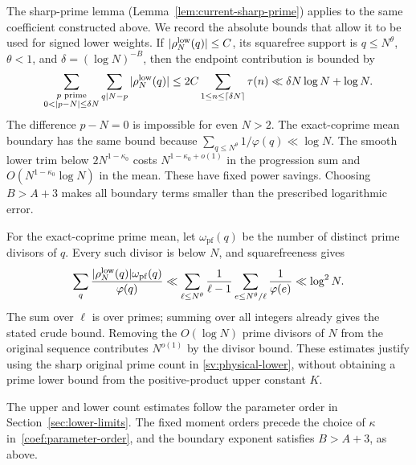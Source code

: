 The sharp-prime lemma (Lemma~\ref{lem:current-sharp-prime}) applies to
the same coefficient constructed above.  We record the absolute bounds
that allow it to be used for signed lower weights.  If
$|\rho_N^{\rm low}(q)|\le C$, its squarefree support is $q\le N^\theta$,
$\theta<1$, and $\delta=(\log N)^{-B}$, then the endpoint contribution
is bounded by
\begin{equation}\label{sv:sharp-boundary}
 \sum_{\substack{p\text{ prime}\\0<|p-N|\le\delta N}}
          \sum_{q\mid N-p}|\rho_N^{\rm low}(q)|
 \le2C\sum_{1\le n\le\lceil\delta N\rceil}\tau(n)
 \ll\delta N\log N+\log N.
\end{equation}
The difference $p-N=0$ is impossible for even $N>2$.
The exact-coprime mean boundary has the same bound because
$\sum_{q\le N^\theta}1/\varphi(q)\ll\log N$.
The smooth lower trim below $2N^{1-\kappa_0}$ costs
$N^{1-\kappa_0+o(1)}$ in the progression sum and
$O(N^{1-\kappa_0}\log N)$ in the mean.  These have fixed power
savings.  Choosing $B>A+3$ makes all boundary terms smaller than the
prescribed logarithmic error.

For the exact-coprime prime mean, let $\omega_{\mathrm{pf}}(q)$ be
the number of distinct prime divisors of $q$.  Every such divisor is
below $N$, and squarefreeness gives
\begin{equation}\label{sv:coprime-prime-error}
 \sum_q\frac{|\rho_N^{\rm low}(q)|\omega_{\mathrm{pf}}(q)}{\varphi(q)}
 \ll\sum_{\ell\le N^\theta}\frac1{\ell-1}
                  \sum_{e\le N^\theta/\ell}\frac1{\varphi(e)}
 \ll\log^2N.
\end{equation}
The sum over $\ell$ is over primes; summing over all integers already
gives the stated crude bound.  Removing the $O(\log N)$ prime divisors
of $N$ from the original sequence contributes $N^{o(1)}$ by the
divisor bound.  These estimates justify using the sharp original
prime count in \eqref{sv:physical-lower}, without obtaining a prime
lower bound from the positive-product upper constant $K$.

The upper and lower count estimates follow the parameter order in
Section~\ref{sec:lower-limits}. The fixed moment orders precede the
choice of $\kappa$ in~\eqref{coef:parameter-order}, and the boundary
exponent satisfies $B>A+3$, as above.
